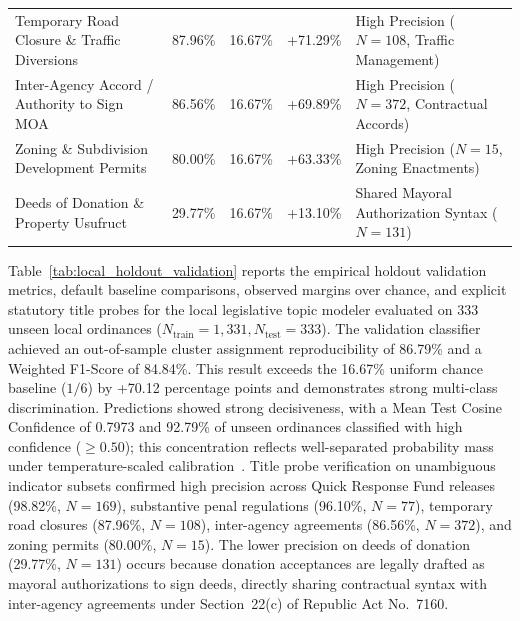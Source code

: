 \begin{table}[!htbp]
\begin{tabularx}{\linewidth}{>{\RaggedRight}p{4.4cm}cc>{\Centering}p{2.2cm}>{\RaggedRight}X}
        Temporary Road Closure \& Traffic Diversions & 87.96\% & 16.67\% & +71.29\% & High Precision ($N=108$, Traffic Management) \\
        Inter-Agency Accord / Authority to Sign MOA & 86.56\% & 16.67\% & +69.89\% & High Precision ($N=372$, Contractual Accords) \\
        Zoning \& Subdivision Development Permits & 80.00\% & 16.67\% & +63.33\% & High Precision ($N=15$, Zoning Enactments) \\
        Deeds of Donation \& Property Usufruct & 29.77\% & 16.67\% & +13.10\% & Shared Mayoral Authorization Syntax ($N=131$) \\
        \bottomrule
    \end{tabularx}
\end{table}

Table~\ref{tab:local_holdout_validation} reports the empirical holdout validation metrics, default baseline comparisons, observed margins over chance, and explicit statutory title probes for the local legislative topic modeler evaluated on 333 unseen local ordinances ($N_{\text{train}} = 1,331, N_{\text{test}} = 333$). The validation classifier achieved an out-of-sample cluster assignment reproducibility of 86.79\% and a Weighted F1-Score of 84.84\%. This result exceeds the 16.67\% uniform chance baseline ($1/6$) by +70.12 percentage points and demonstrates strong multi-class discrimination. Predictions showed strong decisiveness, with a Mean Test Cosine Confidence of 0.7973 and 92.79\% of unseen ordinances classified with high confidence ($\ge 0.50$); this concentration reflects well-separated probability mass under temperature-scaled calibration~\cite{guo2017calibration}. Title probe verification on unambiguous indicator subsets confirmed high precision across Quick Response Fund releases (98.82\%, $N=169$), substantive penal regulations (96.10\%, $N=77$), temporary road closures (87.96\%, $N=108$), inter-agency agreements (86.56\%, $N=372$), and zoning permits (80.00\%, $N=15$). The lower precision on deeds of donation (29.77\%, $N=131$) occurs because donation acceptances are legally drafted as mayoral authorizations to sign deeds, directly sharing contractual syntax with inter-agency agreements under Section~22(c) of Republic Act No.~7160.


